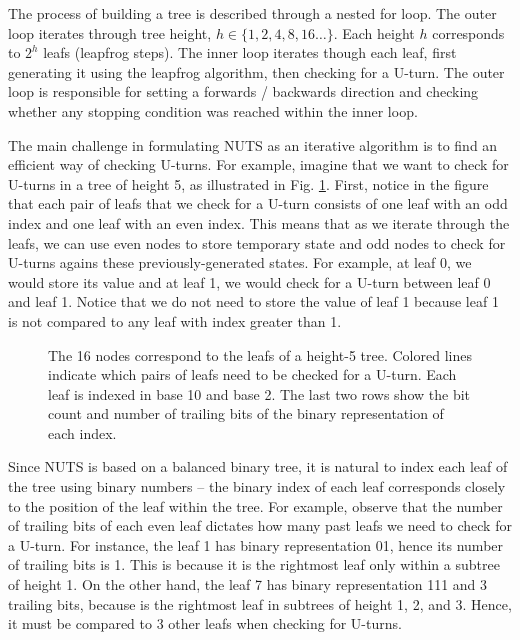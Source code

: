\documentclass[12pt]{article}
\begin{document}
{The process of building a tree is described through a nested for loop. The outer loop iterates through tree height, $h \in \{1, 2, 4, 8, 16 \ldots \}$. Each height $h$ corresponds to $2^h$ leafs (leapfrog steps). The inner loop iterates though each leaf, first generating it using the leapfrog algorithm, then checking for a U-turn. The outer loop is responsible for setting a forwards / backwards direction and checking whether any stopping condition was reached within the inner loop.

The main challenge in formulating NUTS as an iterative algorithm is to find an efficient way of checking U-turns. For example, imagine that we want to check for U-turns in a tree of height 5, as illustrated in Fig. \ref{fig_iterative_nuts_indexing}. First, notice in the figure that each pair of leafs that we check for a U-turn consists of one leaf with an odd index and one leaf with an even index. This means that as we iterate through the leafs, we can use even nodes to store temporary state and odd nodes to check for U-turns agains these previously-generated states. For example, at leaf 0, we would store its value and at leaf 1, we would check for a U-turn between leaf 0 and leaf 1. Notice that we do not need to store the value of leaf 1 because leaf 1 is not compared to any leaf with index greater than 1.

\begin{figure}[ht]
\centering
{}
\caption{The 16 nodes correspond to the leafs of a height-5 tree. Colored lines indicate which pairs of leafs need to be checked for a U-turn. Each leaf is indexed in base 10 and base 2. The last two rows show the bit count and number of trailing bits of the binary representation of each index.}
\label{fig_iterative_nuts_indexing}
\end{figure}

Since NUTS is based on a balanced binary tree, it is natural to index each leaf of the tree using binary numbers -- the binary index of each leaf corresponds closely to the position of the leaf within the tree. For example, observe that the number of trailing bits of each even leaf dictates how many past leafs we need to check for a U-turn. For instance, the leaf 1 has binary representation 01, hence its number of trailing bits is 1. This is because it is the rightmost leaf only within a subtree of height 1. On the other hand, the leaf 7 has binary representation 111 and 3 trailing bits, because is the rightmost leaf in subtrees of height 1, 2, and 3. Hence, it must be compared to 3 other leafs when checking for U-turns.

}
\end{document}
